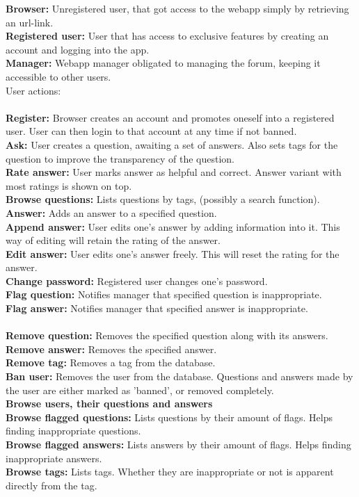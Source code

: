 \documentclass[a4paper,12pt]{article}
\begin{document}
\noindent \textbf{Browser:} Unregistered user, that got access to the webapp simply by retrieving an url-link.\\
\textbf{Registered user:} User that has access to exclusive features by creating an account and logging into the app.\\
\textbf{Manager:} Webapp manager obligated to managing the forum, keeping it accessible to other users.\\

\noindent User actions:\\
\\
\textbf{Register:} Browser creates an account and promotes oneself into a registered user. User can then login to that account at any time if not banned.\\
\textbf{Ask:} User creates a question, awaiting a set of answers. Also sets tags for the question to improve the transparency of the question.\\
\textbf{Rate answer:} User marks answer as helpful and correct. Answer variant with most ratings is shown on top.\\
\textbf{Browse questions:} Lists questions by tags, (possibly a search function).\\
\textbf{Answer:} Adds an answer to a specified question.\\
\textbf{Append answer:} User edits one's answer by adding information into it. This way of editing will retain the rating of the answer.\\
\textbf{Edit answer:} User edits one's answer freely. This will reset the rating for the answer.\\
\textbf{Change password:} Registered user changes one's password.\\
\textbf{Flag question:} Notifies manager that specified question is inappropriate.\\
\textbf{Flag answer:} Notifies manager that specified answer is inappropriate.\\
\\
\textbf{Remove question:} Removes the specified question along with its answers.\\
\textbf{Remove answer:} Removes the specified answer.\\
\textbf{Remove tag:} Removes a tag from the database.\\
\textbf{Ban user:} Removes the user from the database. Questions and answers made by the user are either marked as 'banned', or removed completely.\\
\textbf{Browse users, their questions and answers}\\
\textbf{Browse flagged questions:} Lists questions by their amount of flags. Helps finding inappropriate questions.\\
\textbf{Browse flagged answers:} Lists answers by their amount of flags. Helps finding inappropriate answers.\\
\textbf{Browse tags:} Lists tags. Whether they are inappropriate or not is apparent directly from the tag.\\
\newpage
\end{document}
